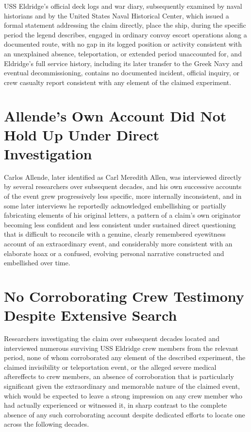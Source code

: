 \documentclass[11pt]{article}
\begin{document}
USS Eldridge's official deck logs and war diary, subsequently examined by naval historians and by the United States Naval Historical Center, which issued a formal statement addressing the claim directly, place the ship, during the specific period the legend describes, engaged in ordinary convoy escort operations along a documented route, with no gap in its logged position or activity consistent with an unexplained absence, teleportation, or extended period unaccounted for, and Eldridge's full service history, including its later transfer to the Greek Navy and eventual decommissioning, contains no documented incident, official inquiry, or crew casualty report consistent with any element of the claimed experiment.

\section{Allende's Own Account Did Not Hold Up Under Direct Investigation}

Carlos Allende, later identified as Carl Meredith Allen, was interviewed directly by several researchers over subsequent decades, and his own successive accounts of the event grew progressively less specific, more internally inconsistent, and in some later interviews he reportedly acknowledged embellishing or partially fabricating elements of his original letters, a pattern of a claim's own originator becoming less confident and less consistent under sustained direct questioning that is difficult to reconcile with a genuine, clearly remembered eyewitness account of an extraordinary event, and considerably more consistent with an elaborate hoax or a confused, evolving personal narrative constructed and embellished over time.

\section{No Corroborating Crew Testimony Despite Extensive Search}

Researchers investigating the claim over subsequent decades located and interviewed numerous surviving USS Eldridge crew members from the relevant period, none of whom corroborated any element of the described experiment, the claimed invisibility or teleportation event, or the alleged severe medical aftereffects to crew members, an absence of corroboration that is particularly significant given the extraordinary and memorable nature of the claimed event, which would be expected to leave a strong impression on any crew member who had actually experienced or witnessed it, in sharp contrast to the complete absence of any such corroborating account despite dedicated efforts to locate one across the following decades.
\end{document}
